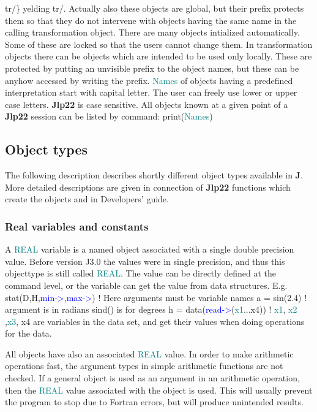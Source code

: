 {tr/\} yelding {tr/\ob}. Actually also these objects are global, but their prefix 
protects them so that they do not intervene with objects having the same name in the 
calling transformation object. 
There are many objects intialized automatically. 
Some of these are locked so that the users cannot change them. In transformation objects 
there can be objects which are intended to be used only locally. These are protected 
by putting an unvisible prefix to the object names, but these can be anyhow accessed 
by writing the prefix. 
\textcolor{teal}{Names} of objects having a predefined interpretation start with capital letter. 
The user can freely use lower or upper case letters. \textbf{Jlp22} is case sensitive. 
All objects known at a given point of a \textbf{Jlp22} session can be listed by command: 
\textcolor{VioletRed}{print}(\textcolor{teal}{Names}) 
\subsection{Object types} 
\label{otypes} 
The following description describes shortly different object types available in 
\textbf{J}. More detailed descriptions are given in connection of \textbf{Jlp22} functions which 
create the objects and in Developers' guide. 
\subsubsection{Real variables and constants} 
\label{realo} 
A \textcolor{teal}{REAL} variable is a named object associated with a single 
double precision value. Before version J3.0 the values were in single 
precision, and thus this objecttype is still called \textcolor{teal}{REAL}. 
The 
value can be directly defined at the command level, or the variable can get 
the value from data structures.  E.g. 
\textcolor{VioletRed}{stat}(D,H,\textcolor{blue}{min->},\textcolor{blue}{max->}) ! Here arguments must be variable names 
a = \textcolor{VioletRed}{sin}(2.4) ! argument is in radians \textcolor{VioletRed}{sind}() is for degrees 
h = \textcolor{VioletRed}{data}(\textcolor{blue}{read->}(\textcolor{teal}{x1}...x4))   ! \textcolor{teal}{x1}, \textcolor{teal}{x2} ,\textcolor{teal}{x3}, x4 are variables in the data set, and 
get their values when doing operations for the data. 
 
 
\begin{note} 
All objects have also an associated \textcolor{teal}{REAL} value. In order to make 
arithmetic operations fast, the argument types in simple arithmetic functions 
are not checked. If a general object is used as an argument in an arithmetic 
operation, then the \textcolor{teal}{REAL} value associated with the object is used. This will 
usually prevent the program to stop due to Fortran errors, but will produce 
unintended results. 
\end{note} 
 
}
